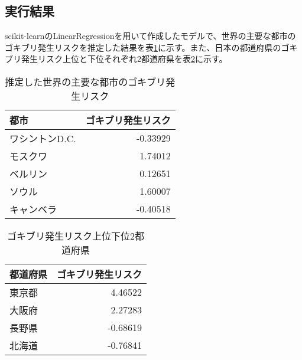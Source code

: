 \documentclass[a4paper,10pt,twocolumn]{jsarticle}
\begin{document}
\subsection{実行結果}
scikit-learnのLinearRegressionを用いて作成したモデルで、世界の主要な都市のゴキブリ発生リスクを推定した結果を表\ref{table:result}に示す。また、日本の都道府県のゴキブリ発生リスク上位と下位それぞれ2都道府県を表\ref{table:japan}に示す。
\begin{table}[h]
 \caption{推定した世界の主要な都市のゴキブリ発生リスク}
 \label{table:result}
 \centering
  \begin{tabular}{lr}
   \hline
	 \hline
	 都市 & ゴキブリ発生リスク \\
   \hline \hline
	 ワシントンD.C. & -0.33929 \\
	 モスクワ & 1.74012 \\
	 ベルリン & 0.12651 \\
	 ソウル & 1.60007 \\
	 キャンベラ & -0.40518 \\
	 \hline
   \hline
  \end{tabular}
\end{table}
\begin{table}[h]
 \caption{ゴキブリ発生リスク上位下位2都道府県}
 \label{table:japan}
 \centering
  \begin{tabular}{lr}
   \hline
	 \hline
	 都道府県 & ゴキブリ発生リスク \\
   \hline \hline
	 東京都 & 4.46522 \\
	 大阪府 & 2.27283 \\
	 長野県 & -0.68619 \\
	 北海道 & -0.76841 \\
	 \hline
   \hline
  \end{tabular}
\end{table}
\end{document}
